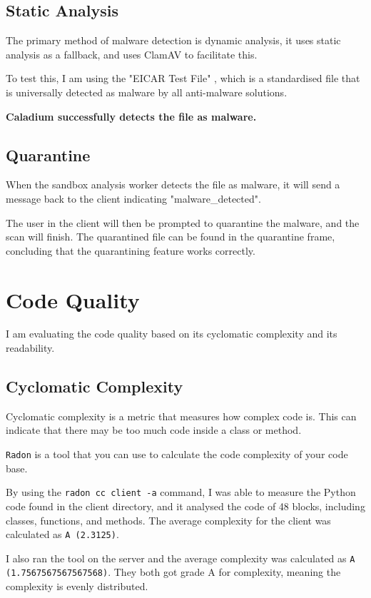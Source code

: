 \subsection{Static Analysis}
The primary method of malware detection is dynamic analysis,
it uses static analysis as a fallback,
and uses ClamAV to facilitate this.

To test this, I am using the "EICAR Test File" \cite{EICAR},
which is a standardised file that is universally
detected as malware by all anti-malware solutions.

\textbf{Caladium successfully detects the file as malware.}

\subsection{Quarantine}
When the sandbox analysis worker detects the file as malware,
it will send a message back to the client indicating "malware\_detected".

The user in the client will then be prompted to quarantine the malware,
and the scan will finish.
The quarantined file can be found in the quarantine frame,
concluding that the quarantining feature works correctly.

\section{Code Quality}
I am evaluating the code quality based on its
cyclomatic complexity and its readability.

\subsection{Cyclomatic Complexity}
Cyclomatic complexity is a metric that
measures how complex code is.
This can indicate that there may be too
much code inside a class or method.

\texttt{Radon} is a tool that you can use to
calculate the code complexity of your code base. \cite{radon}

By using the \texttt{radon cc client -a} command,
I was able to measure the Python code
found in the client directory,
and it analysed the code of 48 blocks,
including classes, functions, and methods.
The average complexity for the client
was calculated as \texttt{A (2.3125)}.

I also ran the tool on the server and the average complexity
was calculated as \texttt{A (1.7567567567567568)}.
They both got grade A for complexity,
meaning the complexity is evenly distributed.

